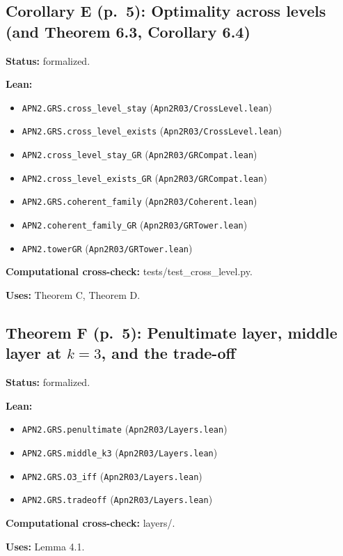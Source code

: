 \documentclass[11pt]{article}
\begin{document}
\subsection*{Corollary E (p.~5): Optimality across levels (and Theorem 6.3, Corollary 6.4)}
\textbf{Status:} formalized.\par
\textbf{Lean:}\begin{itemize}\setlength\itemsep{0pt}
\item \texttt{APN2.GRS.cross\_level\_stay} \hfill (\texttt{Apn2R03/CrossLevel.lean})
\item \texttt{APN2.GRS.cross\_level\_exists} \hfill (\texttt{Apn2R03/CrossLevel.lean})
\item \texttt{APN2.cross\_level\_stay\_GR} \hfill (\texttt{Apn2R03/GRCompat.lean})
\item \texttt{APN2.cross\_level\_exists\_GR} \hfill (\texttt{Apn2R03/GRCompat.lean})
\item \texttt{APN2.GRS.coherent\_family} \hfill (\texttt{Apn2R03/Coherent.lean})
\item \texttt{APN2.coherent\_family\_GR} \hfill (\texttt{Apn2R03/GRTower.lean})
\item \texttt{APN2.towerGR} \hfill (\texttt{Apn2R03/GRTower.lean})
\end{itemize}
\textbf{Computational cross-check:} tests/test\_cross\_level.py.\par
\textbf{Uses:} Theorem C, Theorem D.\par
\subsection*{Theorem F (p.~5): Penultimate layer, middle layer at $k=3$, and the trade-off}
\textbf{Status:} formalized.\par
\textbf{Lean:}\begin{itemize}\setlength\itemsep{0pt}
\item \texttt{APN2.GRS.penultimate} \hfill (\texttt{Apn2R03/Layers.lean})
\item \texttt{APN2.GRS.middle\_k3} \hfill (\texttt{Apn2R03/Layers.lean})
\item \texttt{APN2.GRS.O3\_iff} \hfill (\texttt{Apn2R03/Layers.lean})
\item \texttt{APN2.GRS.tradeoff} \hfill (\texttt{Apn2R03/Layers.lean})
\end{itemize}
\textbf{Computational cross-check:} layers/.\par
\textbf{Uses:} Lemma 4.1.\par
\end{document}
